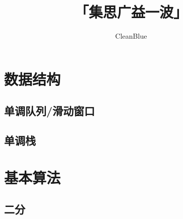 \documentclass[twocolumn,a4]{article}
\title{\CJKfamily{hei} \bfseries 「集思广益一波」}
\author{CleanBlue}
\newcommand{\addcpp}[1]{}
\begin{document}
 \small
\begin{titlepage}
\maketitle
\end{titlepage}

\newpage
\pagestyle{empty}
\renewcommand{\contentsname}{目录}
\tableofcontents
\newpage\clearpage
\newpage
\pagestyle{fancy}
\setcounter{page}{1}   %

\section{数据结构}
	\subsection{单调队列/滑动窗口}
		\addcpp{ds/SlidingWindow.tex}
	\subsection{单调栈}
		\addcpp{ds/mono-stack.tex}
\section{基本算法}
	\subsection{二分}
		\addcpp{basic/binary_search.tex}
\end{document}
